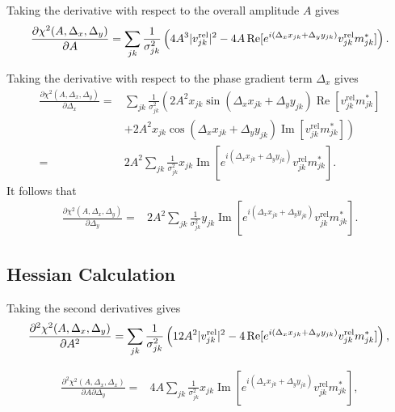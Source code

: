 \documentclass{article}
\newcommand\re{\operatorname{Re}}
\newcommand\im{\operatorname{Im}}
\begin{document}
Taking the derivative with respect to the overall amplitude $A$ gives
\begin{equation}
    \frac{\partial \chi^2(A, \Delta_x, \Delta_y)}{\partial A} = \sum_{jk} \frac{1}{\sigma_{jk}^2} \left( 4 A^3 |v^\text{rel}_{jk}|^2 - 4 A \re[ e^{i(\Delta_x x_{jk} + \Delta_y y_{jk})} v^\text{rel}_{jk} m^*_{jk}] \right). \\
\end{equation}

Taking the derivative with respect to the phase gradient term $\Delta_x$ gives
\begin{equation}
\begin{split}
    \frac{\partial \chi^2(A, \Delta_x, \Delta_y)}{\partial \Delta_x} =& \sum_{jk} \frac{1}{\sigma_{jk}^2} \left( 2 A^2 x_{jk} \sin(\Delta_x x_{jk} + \Delta_y y_{jk}) \re[v^\text{rel}_{jk} m^*_{jk}] \right. \\
    &+ \left. 2 A^2 x_{jk} \cos(\Delta_x x_{jk} + \Delta_y y_{jk}) \im[v^\text{rel}_{jk} m^*_{jk}] \right) \\
    =& 2A^2 \sum_{jk} \frac{1}{\sigma_{jk}^2} x_{jk} \im[e^{i(\Delta_x x_{jk} + \Delta_y y_{jk})} v^\text{rel}_{jk} m^*_{jk}].
\end{split}
\end{equation}
It follows that
\begin{equation}
\begin{split}
    \frac{\partial \chi^2(A, \Delta_x, \Delta_y)}{\partial \Delta_y} =& 2A^2 \sum_{jk} \frac{1}{\sigma_{jk}^2} y_{jk} \im[e^{i(\Delta_x x_{jk} + \Delta_y y_{jk})} v^\text{rel}_{jk} m^*_{jk}].
\end{split}
\end{equation}

\subsection{Hessian Calculation}

Taking the second derivatives gives
\begin{equation}
    \frac{\partial^2 \chi^2(A, \Delta_x, \Delta_y)}{\partial A^2} = \sum_{jk} \frac{1}{\sigma_{jk}^2} \left( 12 A^2 |v^\text{rel}_{jk}|^2 - 4 \re[ e^{i(\Delta_x x_{jk} + \Delta_y y_{jk})} v^\text{rel}_{jk} m^*_{jk}] \right), \\
\end{equation}

\begin{equation}
\begin{split}
    \frac{\partial^2 \chi^2(A, \Delta_x, \Delta_x)}{\partial A \partial \Delta_y} =& 4A \sum_{jk} \frac{1}{\sigma_{jk}^2} x_{jk} \im[e^{i(\Delta_x x_{jk} + \Delta_y y_{jk})} v^\text{rel}_{jk} m^*_{jk}],
\end{split}
\end{equation}
\end{document}
